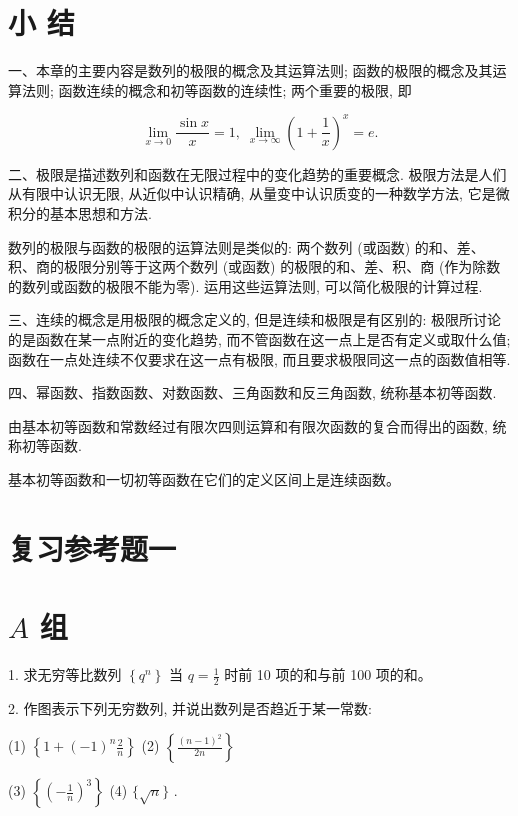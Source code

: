 \documentclass[10pt]{article}
\begin{document}
\section*{小 结}

一、本章的主要内容是数列的极限的概念及其运算法则; 函数的极限的概念及其运算法则; 函数连续的概念和初等函数的连续性; 两个重要的极限, 即

\[
\mathop{\lim }\limits_{{x \rightarrow 0}}\frac{\sin x}{x} = 1,\;\mathop{\lim }\limits_{{x \rightarrow \infty }}{\left( 1 + \frac{1}{x}\right) }^{x} = e.
\]

二、极限是描述数列和函数在无限过程中的变化趋势的重要概念. 极限方法是人们从有限中认识无限, 从近似中认识精确, 从量变中认识质变的一种数学方法, 它是微积分的基本思想和方法.

数列的极限与函数的极限的运算法则是类似的: 两个数列 (或函数) 的和、差、积、商的极限分别等于这两个数列 (或函数) 的极限的和、差、积、商 (作为除数的数列或函数的极限不能为零). 运用这些运算法则, 可以简化极限的计算过程.

三、连续的概念是用极限的概念定义的, 但是连续和极限是有区别的: 极限所讨论的是函数在某一点附近的变化趋势, 而不管函数在这一点上是否有定义或取什么值; 函数在一点处连续不仅要求在这一点有极限, 而且要求极限同这一点的函数值相等.

四、幂函数、指数函数、对数函数、三角函数和反三角函数, 统称基本初等函数.

由基本初等函数和常数经过有限次四则运算和有限次函数的复合而得出的函数, 统称初等函数.

基本初等函数和一切初等函数在它们的定义区间上是连续函数。

\section*{复习参考题一}

\section*{\(A\) 组}

1. 求无穷等比数列 \(\left\{ {q}^{n}\right\}\) 当 \(q = \frac{1}{2}\) 时前 10 项的和与前 100 项的和。

2. 作图表示下列无穷数列, 并说出数列是否趋近于某一常数:

(1) \(\left\{ {1 + {\left( -1\right) }^{n}\frac{2}{n}}\right\}\) (2) \(\left\{ \frac{{\left( n - 1\right) }^{2}}{2n}\right\}\)

(3) \(\left\{ {\left( -\frac{1}{n}\right) }^{3}\right\}\) (4) \(\{ \sqrt{n}\}\) .
\end{document}
